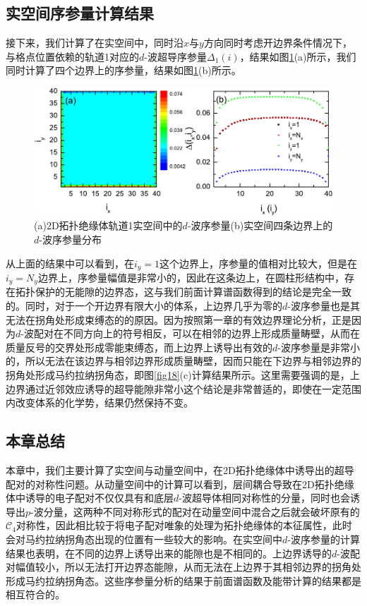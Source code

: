 \subsection{实空间序参量计算结果}
接下来，我们计算了在实空间中，同时沿$x$与$y$方向同时考虑开边界条件情况下，与格点位置依赖的轨道1对应的$d$-波超导序参量$\Delta_1(i)$，结果如图\ref{fig20}(a)所示，我们同时计算了四个边界上的序参量，结果如图\ref{fig20}(b)所示。
\begin{figure}[h]
	\centering
	\includegraphics[scale=0.9]{pic/fig21}
	\caption{(a)2D拓扑绝缘体轨道1实空间中的$d$-波序参量(b)实空间四条边界上的$d$-波序参量分布}\label{fig20}
\end{figure}

从上面的结果中可以看到，在$i_y=1$这个边界上，序参量的值相对比较大，但是在$i_y=N_y$边界上，序参量幅值是非常小的，因此在这条边上，在圆柱形结构中，存在拓扑保护的无能隙的边界态，这与我们前面计算谱函数得到的结论是完全一致的。同时，对于一个开边界有限大小的体系，上边界几乎为零的$d$-波序参量也是其无法在拐角处形成束缚态的的原因。因为按照第一章的有效边界理论分析，正是因为$d$-波配对在不同方向上的符号相反，可以在相邻的边界上形成质量畴壁，从而在质量反号的交界处形成零能束缚态，而上边界上诱导出有效的$d$-波序参量是非常小的，所以无法在该边界与相邻边界形成质量畴壁，因而只能在下边界与相邻边界的拐角处形成马约拉纳拐角态，即图\ref{fig18}(c)计算结果所示。这里需要强调的是，上边界通过近邻效应诱导的超导能隙非常小这个结论是非常普适的，即使在一定范围内改变体系的化学势，结果仍然保持不变。
\subsection{本章总结}
本章中，我们主要计算了实空间与动量空间中，在2D拓扑绝缘体中诱导出的超导配对的对称性问题。从动量空间中的计算可以看到，层间耦合导致在2D拓扑绝缘体中诱导的电子配对不仅仅具有和底层$d$-波超导体相同对称性的分量，同时也会诱导出$p$-波分量，这两种不同对称形式的配对在动量空间中混合之后就会破坏原有的$\mathcal{C}_4$对称性，因此相比较于将电子配对唯象的处理为拓扑绝缘体的本征属性，此时会对马约拉纳拐角态出现的位置有一些较大的影响。在实空间中$d$-波序参量的计算结果也表明，在不同的边界上诱导出来的能隙也是不相同的。上边界诱导的$d$-波配对幅值较小，所以无法打开边界态能隙，从而无法在上边界于其相邻边界的拐角处形成马约拉纳拐角态。这些序参量分析的结果于前面谱函数及能带计算的结果都是相互符合的。







